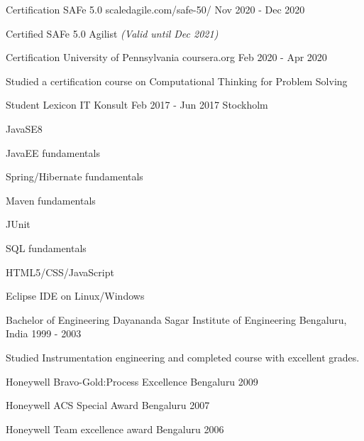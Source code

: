 \documentclass[11pt, a4paper]{awesome-cv}
\begin{document}
  \begin{cventries}
    \cventry
    {Certification}
      {SAFe 5.0}
      {scaledagile.com/safe-50/}
      {Nov 2020 - Dec 2020}
      {
        \begin{cvitems}
        \item {Certified SAFe 5.0 Agilist \textit{(Valid until Dec 2021)}}
        \end{cvitems}
      }

    \cventry
      {Certification}
      {University of Pennsylvania}
      {coursera.org}
      {Feb 2020 - Apr 2020}
      {
        \begin{cvitems}
        \item {Studied a certification course on Computational Thinking for Problem Solving}
        \end{cvitems}
      }

    \cventry
      {Student}
      {Lexicon IT Konsult}
      {Feb 2017 - Jun 2017}
      {Stockholm}
      {
        \begin{cvitems}
          \item JavaSE8
          \item JavaEE fundamentals
          \item Spring/Hibernate fundamentals
          \item Maven fundamentals
          \item JUnit
          \item SQL fundamentals
          \item HTML5/CSS/JavaScript
          \item Eclipse IDE on Linux/Windows
           \end{cvitems}
      }

    \cventry
      {Bachelor of Engineering}
      {Dayananda Sagar Institute of Engineering}
      {Bengaluru, India}
      {1999 - 2003}
      {
        \begin{cvitems}
        \item {Studied Instrumentation engineering and completed course with excellent grades.}
        \end{cvitems}
      }
  \end{cventries}

  \begin{cvhonors}

      \cvhonor
      {Honeywell}
      {Bravo-Gold:Process Excellence}
      {Bengaluru}
      {2009}

      \cvhonor
      {Honeywell}
      {ACS Special Award}
      {Bengaluru}
      {2007}

      \cvhonor
      {Honeywell}
      {Team excellence award}
      {Bengaluru}
      {2006}
  \end{cvhonors}
\end{document}
